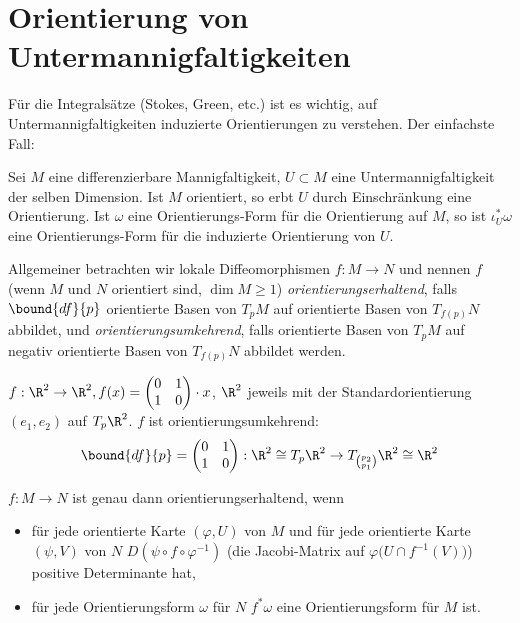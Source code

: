 \section*{Orientierung von Untermannigfaltigkeiten}\lecture

Für die Integralsätze (Stokes, Green, etc.) ist es wichtig, auf Untermannigfaltigkeiten induzierte Orientierungen zu verstehen. Der einfachste Fall:

\begin{lem}
	Sei $M$ eine differenzierbare Mannigfaltigkeit, $U \subset M$ eine Untermannigfaltigkeit der selben Dimension. Ist $M$ orientiert, so erbt $U$ durch Einschränkung eine Orientierung. Ist $\omega$ eine Orientierungs-Form für die Orientierung auf $M$, so ist \( \iota_U^*\omega \) eine Orientierungs-Form für die induzierte Orientierung von $U$.
\end{lem}

Allgemeiner betrachten wir lokale Diffeomorphismen \( f: M \to N \) und nennen $f$ (wenn $M$ und $N$ orientiert sind, $\dim M \geq 1$) \emph{orientierungserhaltend}, falls \( \bound{df}{p} \) orientierte Basen von $T_pM$ auf orientierte Basen von \( T_{f(p)}N \) abbildet, und \emph{orientierungsumkehrend}, falls orientierte Basen von $T_pM$ auf negativ orientierte Basen von \( T_{f(p)}N \) abbildet werden.

\begin{exmp*}
	\( f: \R^2 \to \R^2, f(x) = \begin{pmatrix}
		0&1\\1&0	\end{pmatrix} \cdot x \), $\R^2$ jeweils mit der Standardorientierung $(e_1,e_2)$ auf \( T_p\R^2 \). $f$ ist orientierungsumkehrend:
	\[ \bound{df}{p} = \begin{pmatrix}
		0&1\\1&0	\end{pmatrix}: \R^2 \cong T_p\R^2 \to T_{\binom{p_2}{p_1}}\R^2 \cong \R^2 \]
\end{exmp*}

\begin{rem}
	\( f:M \to N \) ist genau dann orientierungserhaltend, wenn 
	\begin{itemize}
		\item für jede orientierte Karte \( (\varphi,U) \) von $M$ und für jede orientierte Karte \( (\psi,V) \) von $N$ \( D(\psi \circ f \circ \varphi^{-1}) \) \big(die Jacobi-Matrix auf \( \varphi\big(U \cap f^{-1}(V)\big) \)\big) positive Determinante hat,
		\item für jede Orientierungsform $\omega$ für $N$ $f^*\omega$ eine Orientierungsform für $M$ ist.
	\end{itemize}
\end{rem}

